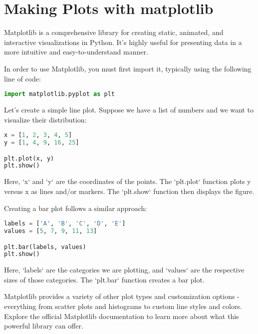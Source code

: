 \chapter{Making Plots with matplotlib}

Matplotlib is a comprehensive library for creating static, animated,
and interactive visualizations in Python. It's highly useful for
presenting data in a more intuitive and easy-to-understand manner.

In order to use Matplotlib, you must first import it, typically using
the following line of code:

\begin{lstlisting}[language=Python]
import matplotlib.pyplot as plt
\end{lstlisting}

Let's create a simple line plot. Suppose we have a list of numbers and
we want to visualize their distribution:

\begin{lstlisting}[language=Python]
x = [1, 2, 3, 4, 5]
y = [1, 4, 9, 16, 25]

plt.plot(x, y)
plt.show()
\end{lstlisting}

Here, `x` and `y` are the coordinates of the points. The `plt.plot`
function plots y versus x as lines and/or markers. The `plt.show`
function then displays the figure.

Creating a bar plot follows a similar approach:

\begin{lstlisting}[language=Python]
labels = ['A', 'B', 'C', 'D', 'E']
values = [5, 7, 9, 11, 13]

plt.bar(labels, values)
plt.show()
\end{lstlisting}

Here, `labels` are the categories we are plotting, and `values` are
the respective sizes of those categories. The `plt.bar` function
creates a bar plot.

Matplotlib provides a variety of other plot types and customization
options - everything from scatter plots and histograms to custom line
styles and colors. Explore the official Matplotlib documentation to
learn more about what this powerful library can offer.
